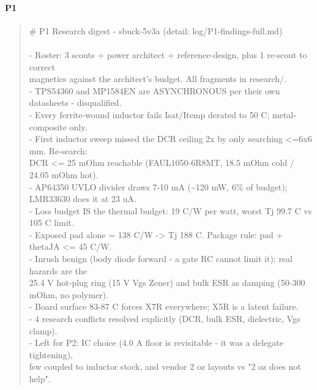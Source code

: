 \documentclass[11pt,a4paper]{article}
\begin{document}
\paragraph*{P1}
\begin{quote}\small\ttfamily\raggedright
\# P1 Research digest - sbuck-5v3a  (detail: log/P1-findings-full.md)\\
~\\
- Roster: 3 scouts + power architect + reference-design, plus 1 re-scout to correct\\
  magnetics against the architect's budget. All fragments in research/.\\
- TPS54360 and MP1584EN are ASYNCHRONOUS per their own datasheets - disqualified.\\
- Every ferrite-wound inductor fails Isat/Itemp derated to 50 C; metal-composite only.\\
- First inductor sweep missed the DCR ceiling 2x by only searching \textless{}=6x6 mm. Re-search:\\
  DCR \textless{}= 25 mOhm reachable (FAUL1050-6R8MT, 18.5 mOhm cold / 24.05 mOhm hot).\\
- AP64350 UVLO divider draws 7-10 mA (\textasciitilde{}120 mW, 6\% of budget); LMR33630 does it at 23 uA.\\
- Loss budget IS the thermal budget: 19 C/W per watt, worst Tj 99.7 C vs 105 C limit.\\
- Exposed pad alone = 138 C/W -\textgreater{} Tj 188 C. Package rule: pad + thetaJA \textless{}= 45 C/W.\\
- Inrush benign (body diode forward - a gate RC cannot limit it); real hazards are the\\
  25.4 V hot-plug ring (15 V Vgs Zener) and bulk ESR as damping (50-300 mOhm, no polymer).\\
- Board surface 83-87 C forces X7R everywhere; X5R is a latent failure.\\
- 4 research conflicts resolved explicitly (DCR, bulk ESR, dielectric, Vgs clamp).\\
- Left for P2: IC choice (4.0 A floor is revisitable - it was a delegate tightening),\\
  fsw coupled to inductor stock, and vendor 2 oz layouts vs "2 oz does not help".
\end{quote}
\end{document}
